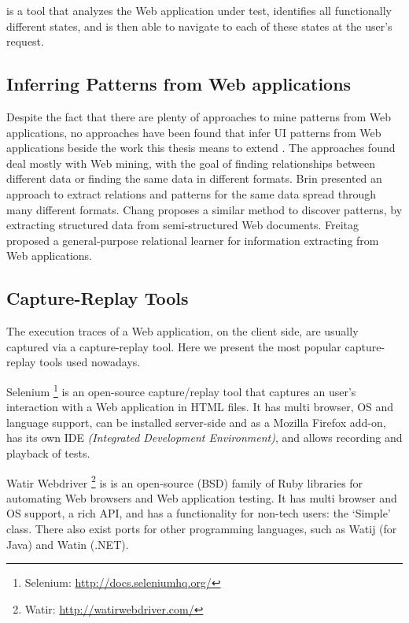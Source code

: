 \cite{dallmeier2012Webmate,dallmeier2013Webmate} is a tool that analyzes the Web application under test, identifies all functionally different states, and is then able to navigate to each of these states at the user’s request.

\subsection{Inferring Patterns from Web applications}
Despite the fact that there are plenty of approaches to mine patterns from Web applications, no approaches have been found that infer UI patterns from Web applications beside the work this thesis means to extend \cite{nabuco2013inferring, morgado2012gui}. The approaches found deal mostly with Web mining, with the goal of finding relationships between different data or finding the same data in different formats. Brin \cite{brin1999extracting} presented an approach to extract relations and patterns for the same data spread through many different formats. Chang \cite{chang2003automatic} proposes a similar method to discover patterns, by extracting structured data from semi-structured Web documents. Freitag \cite{freitag1998information} proposed a general-purpose relational learner for information extracting from Web applications.

\subsection{Capture-Replay Tools}
The execution traces of a Web application, on the client side, are usually captured via a capture-replay tool. Here we present the most popular capture-replay tools used nowadays.

Selenium \footnote{Selenium: \url{http://docs.seleniumhq.org/}} is an open-source capture/replay tool that captures an user's interaction with a Web application in HTML files. It has multi browser, OS and language support, can be installed server-side and as a Mozilla Firefox add-on, has its own IDE \textit{(Integrated Development Environment)}, and allows recording and playback of tests.

Watir Webdriver \footnote{Watir: \url{http://watirwebdriver.com/}} is is an open-source (BSD) family of Ruby libraries for automating Web browsers and Web application testing. It has multi browser and OS support, a rich API, and has a functionality for non-tech users: the ‘Simple’ class. There also exist ports for other programming languages, such as Watij (for Java) and Watin (.NET).

